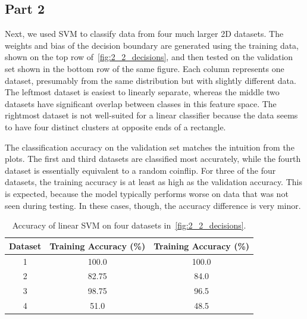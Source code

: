 \subsection{Part 2}
Next, we used SVM to classify data from four much larger 2D datasets.
The weights and bias of the decision boundary are generated using the training data, shown on the top row of~\cref{fig:2_2_decisions}, and then tested on the validation set shown in the bottom row of the same figure.
Each column represents one dataset, presumably from the same distribution but with slightly different data.
The leftmost dataset is easiest to linearly separate, whereas the middle two datasets have significant overlap between classes in this feature space.
The rightmost dataset is not well-suited for a linear classifier because the data seems to have four distinct clusters at opposite ends of a rectangle.

The classification accuracy on the validation set matches the intuition from the plots. The first and third datasets are classified most accurately, while the fourth dataset is essentially equivalent to a random coinflip.
For three of the four datasets, the training accuracy is at least as high as the validation accuracy.
This is expected, because the model typically performs worse on data that was not seen during testing.
In these cases, though, the accuracy difference is very minor.

\begin{table}[ht!]
\centering
\begin{tabular}{||c c c||}  
 \hline
 Dataset & Training Accuracy (\%) & Training Accuracy (\%) \\ [0.5ex] 
 \hline\hline
 1 & 100.0 & 100.0 \\ 
 \hline
 2 & 82.75 & 84.0 \\
 \hline
 3 & 98.75 & 96.5 \\
 \hline
 4 & 51.0 & 48.5 \\
 \hline
\end{tabular}
\caption{Accuracy of linear SVM on four datasets in~\cref{fig:2_2_decisions}.}
\label{table_svm_2_2}
\end{table}


